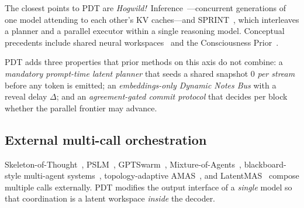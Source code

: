 The closest points to PDT are \emph{Hogwild!}~Inference~\cite{Rodionov2025}---concurrent generations of one model attending to each other's KV caches---and SPRINT~\cite{Xiao2025sprint}, which interleaves a planner and a parallel executor within a single reasoning model. Conceptual precedents include shared neural workspaces~\cite{Goyal2021} and the Consciousness Prior~\cite{Bengio2017ConsciousnessPrior}.

PDT adds three properties that prior methods on this axis do not combine: a \emph{mandatory prompt-time latent planner} that seeds a shared snapshot 0 \emph{per stream} before any token is emitted; an \emph{embeddings-only Dynamic Notes Bus} with a reveal delay $\Delta$; and an \emph{agreement-gated commit protocol} that decides per block whether the parallel frontier may advance.

\subsection{External multi-call orchestration}

Skeleton-of-Thought~\cite{ning2023skeleton}, PSLM~\cite{PSLM2024}, GPTSwarm~\cite{Zhuge2024GPTSwarm}, Mixture-of-Agents~\cite{Wang2025MoA}, blackboard-style multi-agent systems~\cite{Han2025Blackboard,Salemi2025Blackboard}, topology-adaptive AMAS~\cite{Leong2025AMAS}, and LatentMAS~\cite{Zou2025LatentMAS} compose multiple calls externally. PDT modifies the output interface of a \emph{single} model so that coordination is a latent workspace \emph{inside} the decoder.
